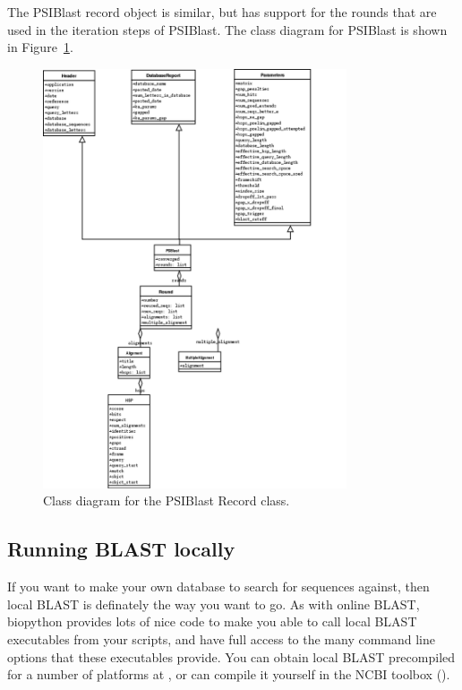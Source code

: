 \documentclass{report}
\begin{document}
The PSIBlast record object is similar, but has support for the rounds that are used in the iteration steps of PSIBlast. The class diagram for PSIBlast is shown in Figure~\ref{fig:psiblastrecord}.

\begin{htmlonly}
\label{fig:psiblastrecord}
\end{htmlonly}

\begin{latexonly}
\begin{figure}[htbp]
\centering
\includegraphics[width=0.8\textwidth]{images/PSIBlastRecord.png}
\caption{Class diagram for the PSIBlast Record class.}
\label{fig:psiblastrecord}
\end{figure}
\end{latexonly}

\subsection{Running BLAST locally}

If you want to make your own database to search for sequences against, then local BLAST is definately the way you want to go. As with online BLAST, biopython provides lots of nice code to make you able to call local BLAST executables from your scripts, and have full access to the many command line options that these executables provide. You can obtain local BLAST precompiled for a number of platforms at , or can compile it yourself in the NCBI toolbox ().
\end{document}
